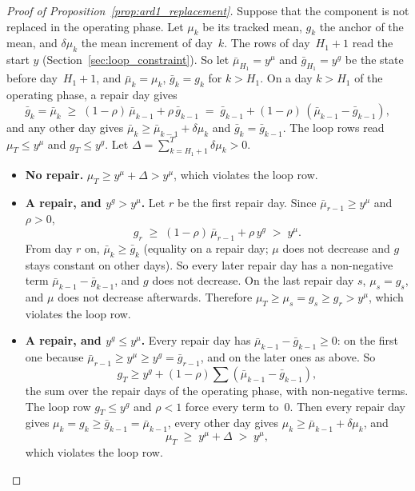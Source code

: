 \documentclass[11pt,a4paper]{article}
\theoremstyle{plain}
\theoremstyle{definition}
\theoremstyle{remark}
\begin{document}
\label{prf:prop:ard1_replacement}
\begin{proof}[Proof of Proposition~\ref{prop:ard1_replacement}]
Suppose that the component is not replaced in the operating phase.
Let $\mu_k$ be its tracked mean, $g_k$ the anchor of the mean, and $\delta\mu_k$ the mean increment of day~$k$.
The rows of day~$H_1 + 1$ read the start $y$ (Section~\ref{sec:loop_constraint}).
So let $\bar\mu_{H_1} = y^{\mu}$ and $\bar g_{H_1} = y^{g}$ be the state before day~$H_1 + 1$, and $\bar\mu_k = \mu_k$, $\bar g_k = g_k$ for $k > H_1$.
On a day $k > H_1$ of the operating phase, a repair day gives
\begin{equation}
  \bar g_k = \bar\mu_k \;\ge\; (1-\rho)\,\bar\mu_{k-1} + \rho\, \bar g_{k-1} \;=\; \bar g_{k-1} + (1-\rho)\,(\bar\mu_{k-1} - \bar g_{k-1}),
\end{equation}
and any other day gives $\bar\mu_k \ge \bar\mu_{k-1} + \delta\mu_k$ and $\bar g_k = \bar g_{k-1}$.
The loop rows read $\mu_T \le y^{\mu}$ and $g_T \le y^{g}$.
Let $\Delta = \sum_{k=H_1+1}^{T} \delta\mu_k > 0$.
\begin{itemize}
  \item \textbf{No repair.} $\mu_T \ge y^{\mu} + \Delta > y^{\mu}$, which violates the loop row.
  \item \textbf{A repair, and $y^{g} > y^{\mu}$.}
    Let $r$ be the first repair day.
    Since $\bar\mu_{r-1} \ge y^{\mu}$ and $\rho > 0$,
    \begin{equation}
      g_r \;\ge\; (1-\rho)\,\bar\mu_{r-1} + \rho\, y^{g} \;>\; y^{\mu}.
    \end{equation}
    From day $r$ on, $\bar\mu_k \ge \bar g_k$ (equality on a repair day; $\mu$ does not decrease and $g$ stays constant on other days).
    So every later repair day has a non-negative term $\bar\mu_{k-1} - \bar g_{k-1}$, and $g$ does not decrease.
    On the last repair day $s$, $\mu_s = g_s$, and $\mu$ does not decrease afterwards.
    Therefore $\mu_T \ge \mu_s = g_s \ge g_r > y^{\mu}$, which violates the loop row.
  \item \textbf{A repair, and $y^{g} \le y^{\mu}$.}
    Every repair day has $\bar\mu_{k-1} - \bar g_{k-1} \ge 0$: on the first one because $\bar\mu_{r-1} \ge y^{\mu} \ge y^{g} = \bar g_{r-1}$, and on the later ones as above.
    So
    \begin{equation}
      g_T \ge y^{g} + (1-\rho)\sum (\bar\mu_{k-1} - \bar g_{k-1}),
    \end{equation}
    the sum over the repair days of the operating phase, with non-negative terms.
    The loop row $g_T \le y^{g}$ and $\rho < 1$ force every term to~$0$.
    Then every repair day gives $\mu_k = g_k \ge \bar g_{k-1} = \bar\mu_{k-1}$, every other day gives $\mu_k \ge \bar\mu_{k-1} + \delta\mu_k$, and
    \begin{equation}
      \mu_T \;\ge\; y^{\mu} + \Delta \;>\; y^{\mu},
    \end{equation}
    which violates the loop row.
\end{itemize}
\end{proof}
\end{document}
